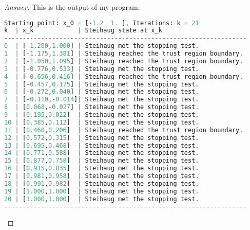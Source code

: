 \documentclass{article}
\begin{document}
        \begin{proof}[Answer]
        This is the output of my program:
\begin{lstlisting}[language=python]
Starting point: x_0 = [-1.2  1. ], Iterations: k = 21
k  | x_k            | Steihaug state at x_k
------------------------------------------------------------------
0  | [-1.200,1.000] | Steihaug met the stopping test.              
1  | [-1.175,1.381] | Steihaug reached the trust region boundary.  
2  | [-1.050,1.095] | Steihaug reached the trust region boundary.  
3  | [-0.776,0.533] | Steihaug met the stopping test.              
4  | [-0.656,0.416] | Steihaug reached the trust region boundary.  
5  | [-0.457,0.175] | Steihaug met the stopping test.              
6  | [-0.272,0.040] | Steihaug met the stopping test.              
7  | [-0.110,-0.014]| Steihaug met the stopping test.              
8  | [0.068,-0.027] | Steihaug met the stopping test.              
9  | [0.195,0.022]  | Steihaug met the stopping test.              
10 | [0.385,0.112]  | Steihaug met the stopping test.              
11 | [0.460,0.206]  | Steihaug reached the trust region boundary.  
12 | [0.572,0.315]  | Steihaug met the stopping test.              
13 | [0.695,0.468]  | Steihaug met the stopping test.              
14 | [0.771,0.588]  | Steihaug met the stopping test.              
15 | [0.877,0.758]  | Steihaug met the stopping test.              
16 | [0.915,0.835]  | Steihaug met the stopping test.              
17 | [0.981,0.958]  | Steihaug met the stopping test.              
18 | [0.991,0.982]  | Steihaug met the stopping test.              
19 | [1.000,1.000]  | Steihaug met the stopping test.              
20 | [1.000,1.000]  | Steihaug met the stopping test.              
------------------------------------------------------------------


\end{lstlisting}
\end{proof}
\end{document}

